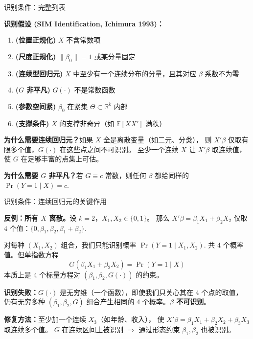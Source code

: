 \documentclass[aspectratio=169, 10pt]{beamer}
\begin{document}
\begin{frame}{识别条件：完整列表}

  \begin{assumptionbox}
  \textbf{识别假设 (SIM Identification, Ichimura 1993)：}
  \begin{enumerate}\setlength{\itemsep}{2pt}
    \item \textbf{(位置正规化)} $X$ 不含常数项
    \item \textbf{(尺度正规化)} $\|\beta_0\| = 1$ 或某分量固定
    \item \textbf{(连续型回归元)} $X$ 中至少有一个连续分布的分量，且其对应 $\beta$ 系数不为零
    \item \textbf{($G$ 非平凡)} $G(\cdot)$ 不是常数函数
    \item \textbf{(参数空间紧)} $\beta_0$ 在紧集 $\Theta \subset \mathbb{R}^k$ 内部
    \item \textbf{(支撑条件)} $X$ 的支撑非奇异（如 $\mathbb{E}[XX']$ 满秩）
  \end{enumerate}
  \end{assumptionbox}

  \begin{keybox}
    \textbf{为什么需要连续回归元？}如果 $X$ 全是离散变量（如二元、分类），
    则 $X'\beta$ 仅取有限多个值，$G(\cdot)$ 在这些点之间不可识别。
    至少一个连续 $X$ 让 $X'\beta$ 取连续值，使 $G$ 在足够丰富的点集上可估。
  \end{keybox}

  \textbf{为什么需要 $G$ 非平凡？}若 $G \equiv c$ 常数，则任何 $\beta$ 都给同样的 $\Pr(Y=1\mid X) = c$.

\end{frame}

\begin{frame}{识别条件：连续回归元的关键作用}

  \textbf{反例：所有 $X$ 离散。}设 $k=2$，$X_1, X_2 \in \{0, 1\}$。
  那么 $X'\beta = \beta_1 X_1 + \beta_2 X_2$ 仅取 4 个值：$\{0, \beta_1, \beta_2, \beta_1+\beta_2\}$.

  \vspace{0.3em}
  对每种 $(X_1, X_2)$ 组合，我们只能识别概率 $\Pr(Y=1\mid X_1, X_2)$.
  共 4 个概率值。但单指数方程
  $$G(\beta_1 X_1 + \beta_2 X_2) = \Pr(Y=1\mid X)$$
  本质上是 4 个标量方程对 $(\beta_1, \beta_2, G(\cdot))$ 的约束。

  \begin{highlightbox}
    \textbf{识别失败：}$G(\cdot)$ 是无穷维（一个函数），即使我们只关心其在 4 个点的取值，
    仍有无穷多种 $(\beta_1, \beta_2, G)$ 组合产生相同的 4 个概率。\textbf{$\beta$ 不可识别}。
  \end{highlightbox}

  \begin{keybox}
    \textbf{修复方法：}至少加一个连续 $X_3$（如年龄、收入），
    使 $X'\beta = \beta_1 X_1 + \beta_2 X_2 + \beta_3 X_3$ 取连续多个值。
    $G$ 在连续区间上被识别 $\Rightarrow$ 通过形态约束 $\beta_1, \beta_2$ 也被识别。
  \end{keybox}

\end{frame}
\end{document}
